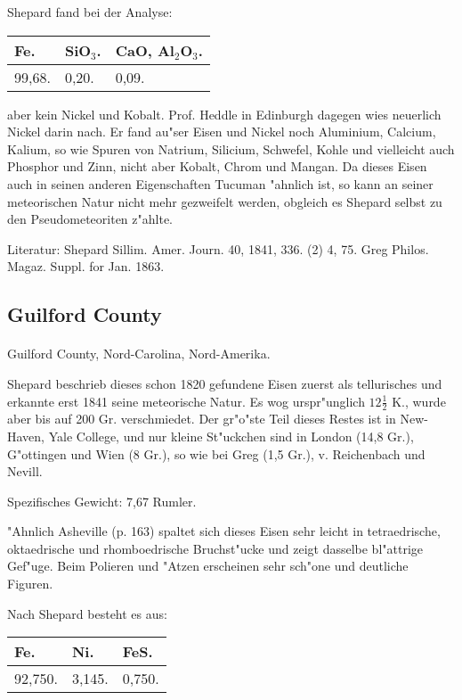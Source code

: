\documentclass[a4paper, 11pt, oneside]{article}
\begin{document}
Shepard fand bei der Analyse:
\begin{table}[H]
    \centering
    \begin{tabular}{l l l}
        Fe. & SiO$_{3}$. & CaO, Al$_{2}$O$_{3}$. \\ \hline
        99,68. & 0,20. & 0,09. \\
    \end{tabular}
\end{table}

aber kein Nickel und Kobalt. Prof. Heddle in Edinburgh dagegen wies neuerlich Nickel darin nach. Er fand au"ser Eisen und Nickel noch Aluminium, Calcium, Kalium, so wie Spuren von Natrium, Silicium, Schwefel, Kohle und vielleicht auch Phosphor und Zinn, nicht aber Kobalt, Chrom und Mangan. Da dieses Eisen auch in seinen anderen Eigenschaften Tucuman "ahnlich ist, so kann an seiner meteorischen Natur nicht mehr gezweifelt werden, obgleich es Shepard selbst zu den Pseudometeoriten z"ahlte.

\footnotesize
Literatur: Shepard Sillim. Amer. Journ. 40, 1841, 336. (2) 4, 75. Greg Philos. Magaz. Suppl. for Jan. 1863.

\subsection{Guilford County}
\normalsize
\paragraph{}
Guilford County, Nord-Carolina, Nord-Amerika.

Shepard beschrieb dieses schon 1820 gefundene Eisen zuerst als tellurisches und erkannte erst 1841 seine meteorische Natur. Es wog urspr"unglich $12\frac{1}{2}$ K., wurde aber bis auf 200 Gr. verschmiedet. Der gr"o"ste Teil dieses Restes ist in New-Haven, Yale College, und nur kleine St"uckchen sind in London (14,8 Gr.), G"ottingen und Wien (8 Gr.), so wie bei Greg (1,5 Gr.), v. Reichenbach und Nevill.

Spezifisches Gewicht: 7,67 Rumler.

"Ahnlich Asheville (p. 163) spaltet sich dieses Eisen sehr leicht in tetraedrische, oktaedrische und rhomboedrische Bruchst"ucke und zeigt dasselbe bl"attrige Gef"uge. Beim Polieren und "Atzen erscheinen sehr sch"one und deutliche Figuren.

Nach Shepard besteht es aus:
\begin{table}[H]
    \centering
    \begin{tabular}{l l l}
        Fe. & Ni. & FeS. \\ \hline
        92,750. & 3,145. & 0,750. \\
    \end{tabular}
\end{table}
\end{document}

